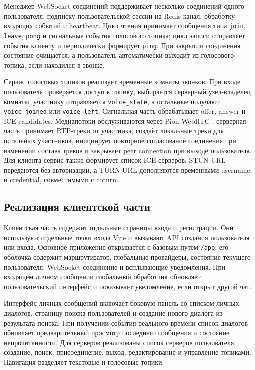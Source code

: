 \documentclass[a4paper,12pt]{extarticle}
\begin{document}
Менеджер WebSocket-соединений поддерживает несколько соединений одного пользователя, подписку пользовательской сессии на Redis-канал, обработку входящих событий и heartbeat. Цикл чтения принимает сообщения типа \texttt{join}, \texttt{leave}, \texttt{pong} и сигнальные события голосового топика; цикл записи отправляет события клиенту и периодически формирует \texttt{ping}. При закрытии соединения состояние очищается, а пользователь автоматически выходит из голосового топика, если находился в звонке.

Сервис голосовых топиков реализует временные комнаты звонков. При входе пользователя проверяется доступ к топику, выбирается серверный узел-владелец комнаты, участнику отправляется \texttt{voice\_state}, а остальные получают \texttt{voice\_joined} или \texttt{voice\_left}. Сигнальная часть обрабатывает offer, answer и ICE candidates. Медиапотоки обслуживаются через Pion WebRTC \cite{pion_webrtc}: серверная часть принимает RTP-треки от участника, создаёт локальные треки для остальных участников, инициирует повторное согласование соединения при изменении состава треков и закрывает peer connection при выходе пользователя. Для клиента сервис также формирует список ICE-серверов: STUN URL передаются без авторизации, а TURN URL дополняются временными username и credential, совместимыми с coturn.

\subsection{Реализация клиентской части}

Клиентская часть содержит отдельные страницы входа и регистрации. Они используют отдельные точки входа Vite и вызывают API создания пользователя или входа. Основное приложение открывается с базовым путём \texttt{/app}; его оболочка содержит маршрутизатор, глобальные провайдеры, состояние текущего пользователя, WebSocket-соединение и всплывающие уведомления. При входящем личном сообщении глобальный обработчик обновляет пользовательский интерфейс и показывает уведомление, если открыт другой чат.

Интерфейс личных сообщений включает боковую панель со списком личных диалогов, страницу поиска пользователей и создание нового диалога из результата поиска. При получении события реального времени список диалогов обновляет предварительный просмотр последнего сообщения и состояние непрочитанности. Для серверов реализованы список серверов пользователя, создание, поиск, присоединение, выход, редактирование и управление топиками. Навигация разделяет текстовые и голосовые топики.
\end{document}

